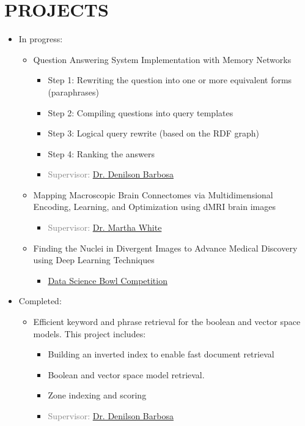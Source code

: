 \section{PROJECTS}
\begin{itemize}
	\item In progress:
	\begin{itemize}
		\item Question Answering System Implementation with Memory Networks
		\begin{itemize}
			\item Step 1: Rewriting the question into one or more 
			equivalent forms (paraphrases)
			\item Step 2: Compiling questions into query templates
			\item Step 3: Logical query rewrite (based on the
			RDF graph)
			\item Step 4: Ranking the answers
			\item \textcolor{gray}{Supervisor: \href{https://sites.ualberta.ca/~denilson/}{Dr. Denilson Barbosa}}
		\end{itemize}
		
		\item Mapping Macroscopic Brain Connectomes via
		Multidimensional Encoding, Learning, and Optimization using dMRI brain images
		\begin{itemize}
			\item \textcolor{gray}{Supervisor: \href{http://webdocs.cs.ualberta.ca/~whitem/}{Dr. Martha White}}
		\end{itemize}
		
		\item Finding the Nuclei in Divergent Images to Advance
		Medical Discovery using Deep Learning Techniques
		\begin{itemize}
			\item \textcolor{gray}{\href{https://www.kaggle.com/c/data-science-bowl-2018}{Data Science Bowl Competition}}
		\end{itemize}
		
	\end{itemize}
	
	\item Completed:
	\begin{itemize}
		\item Efficient keyword and phrase retrieval for the boolean and vector space models. This project includes:
		\begin{itemize}
			\item Building an inverted index to enable fast document retrieval
			\item Boolean and vector space model retrieval.
			\item Zone indexing and scoring
			\item \textcolor{gray}{Supervisor: \href{https://sites.ualberta.ca/~denilson/}{Dr. Denilson Barbosa}}
		\end{itemize}
		

\end{itemize}
\end{itemize}
